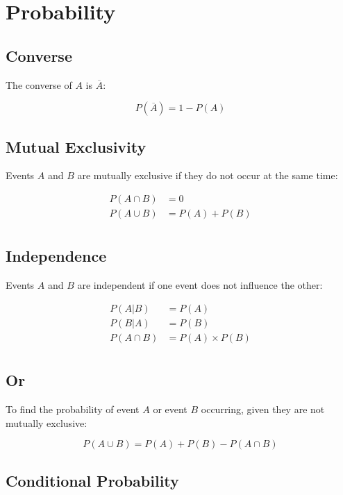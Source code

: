 \documentclass[a4paper,11pt]{article}
\begin{document}
\section{Probability}

\subsection{Converse}

The converse of $A$ is $\overline{A}$:

$$
P(\overline{A}) = 1 - P(A)
$$


\subsection{Mutual Exclusivity}

Events $A$ and $B$ are mutually exclusive if they do not occur at the same time:

$$
\begin{aligned}
P(A \cap B) & = 0 \\
P(A \cup B) & = P(A) + P(B) \\
\end{aligned}
$$


\subsection{Independence}

Events $A$ and $B$ are independent if one event does not influence the other:

$$
\begin{aligned}
P(A|B) & = P(A) \\
P(B|A) & = P(B) \\
P(A \cap B) & = P(A) \times P(B) \\
\end{aligned}
$$


\subsection{Or}

To find the probability of event $A$ or event $B$ occurring, given they are not
mutually exclusive:

$$
P(A \cup B) = P(A) + P(B) - P(A \cap B)
$$


\subsection{Conditional Probability}
\end{document}
